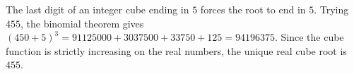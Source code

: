 The last digit of an integer cube ending in $5$ forces the root to end in $5$. Trying $455$, the binomial theorem gives $(450+5)^3=91125000+3037500+33750+125=94196375$. Since the cube function is strictly increasing on the real numbers, the unique real cube root is $\boxed{455}$.
